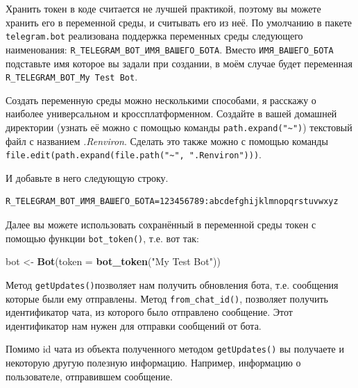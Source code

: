 \documentclass[
]{book}
\newenvironment{Shaded}{\begin{snugshade}}{\end{snugshade}}
\newcommand{\AttributeTok}[1]{\textcolor[rgb]{0.13,0.29,0.53}{#1}}
\newcommand{\DataTypeTok}[1]{\textcolor[rgb]{0.13,0.29,0.53}{#1}}
\newcommand{\DecValTok}[1]{\textcolor[rgb]{0.00,0.00,0.81}{#1}}
\newcommand{\FunctionTok}[1]{\textcolor[rgb]{0.13,0.29,0.53}{\textbf{#1}}}
\newcommand{\NormalTok}[1]{#1}
\newcommand{\OtherTok}[1]{\textcolor[rgb]{0.56,0.35,0.01}{#1}}
\newcommand{\SpecialCharTok}[1]{\textcolor[rgb]{0.81,0.36,0.00}{\textbf{#1}}}
\newcommand{\StringTok}[1]{\textcolor[rgb]{0.31,0.60,0.02}{#1}}
\begin{document}
Хранить токен в коде считается не лучшей практикой, поэтому вы можете хранить его в переменной среды, и считывать его из неё. По умолчанию в пакете \texttt{telegram.bot} реализована поддержка переменных среды следующего наименования: \texttt{R\_TELEGRAM\_BOT\_ИМЯ\_ВАШЕГО\_БОТА}. Вместо \texttt{ИМЯ\_ВАШЕГО\_БОТА} подставьте имя которое вы задали при создании, в моём случае будет переменная \texttt{R\_TELEGRAM\_BOT\_My\ Test\ Bot}.

Создать переменную среды можно несколькими способами, я расскажу о наиболее универсальном и кроссплатформенном. Создайте в вашей домашней директории (узнать её можно с помощью команды \texttt{path.expand("\textasciitilde{}")}) текстовый файл с названием \emph{.Renviron}. Сделать это также можно с помощью команды \texttt{file.edit(path.expand(file.path("\textasciitilde{}",\ ".Renviron")))}.

И добавьте в него следующую строку.

\begin{verbatim}
R_TELEGRAM_BOT_ИМЯ_ВАШЕГО_БОТА=123456789:abcdefghijklmnopqrstuvwxyz
\end{verbatim}

Далее вы можете использовать сохранённый в переменной среды токен с помощью функции \texttt{bot\_token()}, т.е. вот так:

\begin{Shaded}
\begin{Highlighting}[]
\NormalTok{bot }\OtherTok{\textless{}{-}} \FunctionTok{Bot}\NormalTok{(}\AttributeTok{token =} \FunctionTok{bot\_token}\NormalTok{(}\StringTok{"My Test Bot"}\NormalTok{))}
\end{Highlighting}
\end{Shaded}

Метод \texttt{getUpdates()}позволяет нам получить обновления бота, т.е. сообщения которые были ему отправлены. Метод \texttt{from\_chat\_id()}, позволяет получить идентификатор чата, из которого было отправлено сообщение. Этот идентификатор нам нужен для отправки сообщений от бота.

Помимо id чата из объекта полученного методом \texttt{getUpdates()} вы получаете и некоторую другую полезную информацию. Например, информацию о пользователе, отправившем сообщение.

\begin{Shaded}
\end{Shaded}
\end{document}
